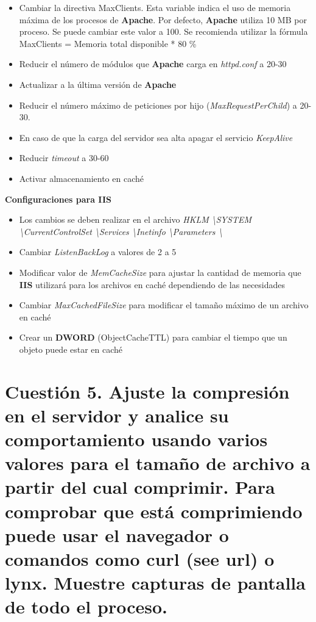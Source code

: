 \begin{itemize}
\item{Cambiar la directiva MaxClients. Esta variable indica el uso de memoria máxima de los procesos de \textbf{Apache}. Por defecto, \textbf{Apache} utiliza 10 MB por proceso. Se puede cambiar este valor a 100.
Se recomienda utilizar la fórmula MaxClients = Memoria total disponible * 80 \%}
\item{Reducir el número de módulos que \textbf{Apache} carga en \textit{httpd.conf} a 20-30}
\item{Actualizar a la última versión de \textbf{Apache}}
\item{Reducir el número máximo de peticiones por hijo (\textit{MaxRequestPerChild}) a 20-30.}
\item{En caso de que la carga del servidor sea alta apagar el servicio \textit{KeepAlive}}
\item{Reducir \textit{timeout} a 30-60}
\item{Activar almacenamiento en caché}

\end{itemize}

\textbf{Configuraciones para IIS}

\begin{itemize}
\item{Los cambios se deben realizar en el archivo \textit{HKLM \textbackslash SYSTEM \textbackslash CurrentControlSet \textbackslash Services \textbackslash Inetinfo \textbackslash Parameters \textbackslash}}
\item{Cambiar \textit{ListenBackLog} a valores de 2 a 5}
\item{Modificar valor de \textit{MemCacheSize} para ajustar la cantidad de memoria que \textbf{IIS} utilizará para los archivos en caché dependiendo de las necesidades}
\item{Cambiar \textit{MaxCachedFileSize} para modificar el tamaño máximo de un archivo en caché}
\item{Crear un \textbf{DWORD} (ObjectCacheTTL) para cambiar el tiempo que un objeto puede estar en caché}

\end{itemize}

\section{Cuestión 5. Ajuste la compresión en el servidor y analice su comportamiento usando varios valores para el tamaño de archivo a partir del cual comprimir. Para comprobar que está comprimiendo puede usar el navegador o comandos como curl (see url) o lynx. Muestre capturas de pantalla de todo el proceso.}

